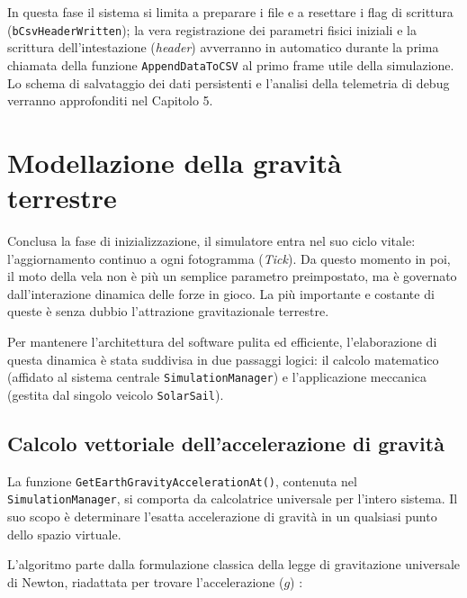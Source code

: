 In questa fase il sistema si limita a preparare i file e a resettare i flag di scrittura (\lstinline|bCsvHeaderWritten|); la vera registrazione dei parametri fisici iniziali e la scrittura dell'intestazione (\textit{header}) avverranno in automatico durante la prima chiamata della funzione \lstinline|AppendDataToCSV| al primo frame utile della simulazione. Lo schema di salvataggio dei dati persistenti e l'analisi della telemetria di debug verranno approfonditi nel Capitolo 5.


\section{Modellazione della gravità terrestre}

Conclusa la fase di inizializzazione, il simulatore entra nel suo ciclo vitale: l'aggiornamento continuo a ogni fotogramma (\textit{Tick}). Da questo momento in poi, il moto della vela non è più un semplice parametro preimpostato, ma è governato dall'interazione dinamica delle forze in gioco. La più importante e costante di queste è senza dubbio l'attrazione gravitazionale terrestre.

Per mantenere l'architettura del software pulita ed efficiente, l'elaborazione di questa dinamica è stata suddivisa in due passaggi logici: il calcolo matematico (affidato al sistema centrale \lstinline|SimulationManager|) e l'applicazione meccanica (gestita dal singolo veicolo \lstinline|SolarSail|).


\subsection{Calcolo vettoriale dell'accelerazione di gravità}

La funzione \lstinline|GetEarthGravityAccelerationAt()|, contenuta nel \lstinline|SimulationManager|, si comporta da calcolatrice universale per l'intero sistema. Il suo scopo è determinare l'esatta accelerazione di gravità in un qualsiasi punto dello spazio virtuale.

L'algoritmo parte dalla formulazione classica della legge di gravitazione universale di Newton, riadattata per trovare l'accelerazione ($g$) \cite{curtis2005orbital}:

